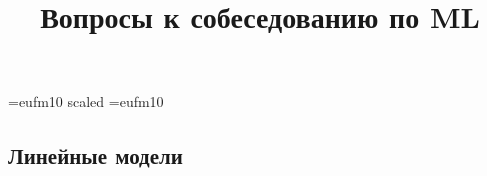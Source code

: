 \documentclass[12pt]{article}
\title{Вопросы к собеседованию по ML}
\begin{document}
\hoffset=-15mm

\font\Got=eufm10 scaled \font\Got=eufm10

\renewcommand{\vec}[1]{\boldsymbol{#1}}
\newcommand{\tr}[1]{\text{tr}{#1}}
\newcommand\cond[1][]{\:#1\vert\:}

\renewcommand{\figurename}{}
\renewcommand\thefigure{{}} 


\makeatletter
\long{}
\makeatother
\maketitle

\subsection*{Линейные модели}
\end{document}
